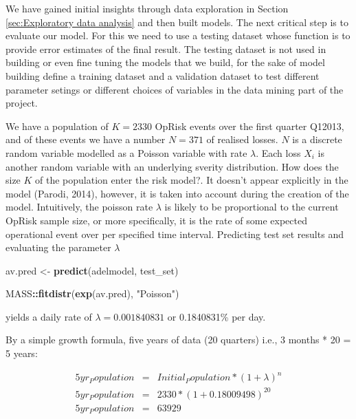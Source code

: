\documentclass[]{DissertateUSU}
\newenvironment{Shaded}{\begin{snugshade}}{\end{snugshade}}
\newcommand{\KeywordTok}[1]{\textcolor[rgb]{0.13,0.29,0.53}{\textbf{#1}}}
\newcommand{\StringTok}[1]{\textcolor[rgb]{0.31,0.60,0.02}{#1}}
\newcommand{\OperatorTok}[1]{\textcolor[rgb]{0.81,0.36,0.00}{\textbf{#1}}}
\newcommand{\NormalTok}[1]{#1}
\begin{document}
We have gained initial insights through data exploration in Section
\ref{sec:Exploratory data analysis} and then built models. The next
critical step is to evaluate our model. For this we need to use a
testing dataset whose function is to provide error estimates of the
final result. The testing dataset is not used in building or even fine
tuning the models that we build, for the sake of model building define a
training dataset and a validation dataset to test different parameter
setings or different choices of variables in the data mining part of the
project.\medskip

We have a population of \(K = 2330\) OpRisk events over the first
quarter Q12013, and of these events we have a number \(N = 371\) of
realised losses. \(N\) is a discrete random variable modelled as a
Poisson variable with rate \(\lambda\). Each loss \(X_i\) is another
random variable with an underlying sverity distribution. How does the
size \(K\) of the population enter the risk model?. It doesn't appear
explicitly in the model (Parodi, 2014), however, it is taken into
account during the creation of the model. Intuitively, the poisson rate
\(\lambda\) is likely to be proportional to the current OpRisk sample
size, or more specifically, it is the rate of some expected operational
event over per specified time interval. Predicting test set results and
evaluating the parameter \(\lambda\)

\singlespacing

\begin{Shaded}
\begin{Highlighting}[]
\NormalTok{av.pred <-}\StringTok{ }\KeywordTok{predict}\NormalTok{(adelmodel, test_set)}

\NormalTok{MASS}\OperatorTok{::}\KeywordTok{fitdistr}\NormalTok{(}\KeywordTok{exp}\NormalTok{(av.pred), }\StringTok{"Poisson"}\NormalTok{)}
\end{Highlighting}
\end{Shaded}

\doublespacing

yields a daily rate of \(\lambda = 0.001840831\) or 0.1840831\% per
day.\medskip 

By a simple growth formula, five years of data (20 quarters) i.e., 3
months * 20 = 5 years:

\singlespacing

\begin{eqnarray}
5yr_Population &=& Initial_Population * (1 + \lambda)^n \nonumber \\
5yr_Population &=& 2330*(1+0.18009498)^20 \nonumber \\
5yr_Population &=& 63929
\end{eqnarray}
\end{document}
